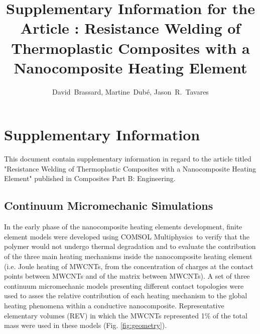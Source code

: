 \documentclass[11pt,review,times]{article}
\begin{document}


\title{Supplementary Information for the Article : Resistance Welding of Thermoplastic Composites with a Nanocomposite Heating Element}
\author{David~Brassard, Martine~Dubé, Jason~R.~Tavares}

\maketitle


							\section{Supplementary Information}

This document contain supplementary information in regard to the article titled "Resistance Welding of Thermoplastic Composites with a Nanocomposite Heating Element" published in Composites Part B: Engineering. 

\subsection{Continuum Micromechanic Simulations}

In the early phase of the nanocomposite heating elements development, finite element models were developed using COMSOL Mul\-ti\-phy\-sics\-\textregistered \ to verify that the polymer would not undergo thermal degradation and to evaluate the contribution of the three main heating mechanisms inside the nanocomposite heating element (i.e. Joule heating of MWCNTs, from the concentration of charges at the contact points between MWCNTs and of the matrix between MWCNTs).  
A set of three continuum micromechanic models presenting different contact topologies were used to asses the relative contribution of each heating mechanism to the global heating phenomena within a conductive nanocomposite. 
Representative elementary volumes (REV) in which the MWCNTs represented 1\% of the total mass were used in these models (Fig. \ref{fig:geometry}). 
\end{document}
